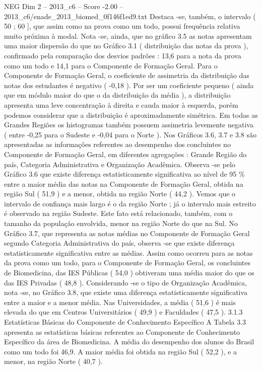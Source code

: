 \begin{textsample}{NEG Dim 2 – 2013\_c6 – Score -2.00 – 2013\_c6/enade\_2013\_biomed\_0f146f1ed9.txt}
Destaca -se, também, o intervalo ( 50 ; 60 ], que assim como na prova como um todo, possui frequência relativa muito próxima à modal.
Nota -se, ainda, que no gráfico 3.5 as notas apresentam uma maior dispersão do que no Gráfico 3.1 ( distribuição das notas da prova ), confirmado pela comparação dos desvios padrões : 13,6 para a nota da prova como um todo e 14,1 para o Componente de Formação Geral.
Para o Componente de Formação Geral, o coeficiente de assimetria da distribuição das notas dos estudantes é negativo ( -0,18 ).
Por ser um coeficiente pequeno ( ainda que em módulo maior do que o da distribuição da média ), a distribuição apresenta uma leve concentração à direita e cauda maior à esquerda, porém podemos considerar que a distribuição é aproximadamente simétrica.
Em todas as Grandes Regiões os histogramas também possuem assimetria levemente negativa ( entre -0,25 para o Sudeste e -0,04 para o Norte ).
Nos Gráficos 3.6, 3.7 e 3.8 são apresentadas as informações referentes ao desempenho dos concluintes no Componente de Formação Geral, em diferentes agregações : Grande Região do país, Categoria Administrativa e Organização Acadêmica.
Observa -se pelo Gráfico 3.6 que existe diferença estatisticamente significativa ao nível de 95 \% entre a maior média das notas na Componente de Formação Geral, obtida na região Sul ( 51,9 ) e a menor, obtida na região Norte ( 44,2 ).
Vemos que o intervalo de confiança mais largo é o da região Norte ; já o intervalo mais estreito é observado na região Sudeste.
Este fato está relacionado, também, com o tamanho da população envolvida, menor na região Norte do que na Sul.
No Gráfico 3.7, que representa as notas médias no Componente de Formação Geral segundo Categoria Administrativa do país, observa -se que existe diferença estatisticamente significativa entre as médias.
Assim como ocorreu para as notas da prova como um todo, para o Componente de Formação Geral, os concluintes de Biomedicina, das IES Públicas ( 54,0 ) obtiveram uma média maior do que os das IES Privadas ( 48,8 ).
Considerando -se o tipo de Organização Acadêmica, nota -se, no Gráfico 3.8, que existe uma diferença estatisticamente significativa entre a maior e a menor média.
Nas Universidades, a média ( 51,6 ) é mais elevada do que em Centros Universitários ( 49,9 ) e Faculdades ( 47,5 ). 3.1.3 Estatísticas Básicas do Componente de Conhecimento Específico A Tabela 3.3 apresenta as estatísticas básicas referentes ao Componente de Conhecimento Específico da área de Biomedicina.
A média do desempenho dos alunos do Brasil como um todo foi 46,9.
A maior média foi obtida na região Sul ( 52,2 ), e a menor, na região Norte ( 40,7 ).

\end{textsample}
